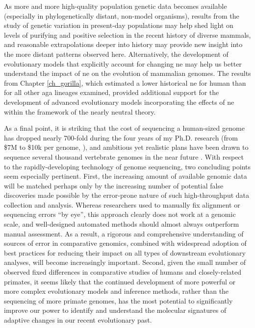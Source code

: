 As more and more high-quality population genetic data becomes
available (especially in phylogenetically distant, non-model
organisms), results from the study of genetic variation in present-day
populations may help shed light on levels of purifying and positive
selection in the recent history of diverse mammals, and reasonable
extrapolations deeper into history may provide new insight into the
more distant patterns observed here. Alternatively, the development of
evolutionary models that explicitly account for changing \ac{ne} may
help us better understand the impact of \ac{ne} on the evolution of
mammalian genomes. The results from Chapter \ref{ch_gorilla}, which
estimated a lower historical \ac{ne} for human than for all other
\ac{aga} lineages examined, provided additional support for the
development of advanced evolutionary models incorporating the effects
of \ac{ne} within the framework of the nearly neutral theory.


As a final point, it is striking that the cost of sequencing a
human-sized genome has dropped nearly 700-fold during the four years
of my Ph.D. research (from \$7M to \$10k per genome,
\citep{Wetterstrand2011}), and ambitious yet realistic plans have been
drawn to sequence several thousand vertebrate genomes in the near
future \citep{Haussler2009}. With respect to the rapidly-developing
technology of genome sequencing, two concluding points seem especially
pertinent. First, the increasing amount of available genomic data will
be matched perhaps only by the increasing number of potential false
discoveries made possible by the error-prone nature of such
high-throughput data collection and analysis. Whereas researchers used
to manually fix alignment or sequencing errors ``by eye'', this
approach clearly does not work at a genomic scale, and well-designed
automated methods should almost always outperform manual
assessment. As a result, a rigorous and comprehensive understanding of
sources of error in comparative genomics, combined with widespread
adoption of best practices for reducing their impact on all types of
downstream evolutionary analyses, will become increasingly
important. Second, given the small number of observed fixed
differences in comparative studies of humans and closely-related
primates, it seems likely that the continued development of more
powerful or more complex evolutionary models and inference methods,
rather than the sequencing of more primate genomes, has the most
potential to significantly improve our power to identify and
understand the molecular signatures of adaptive changes in our recent
evolutionary past.
